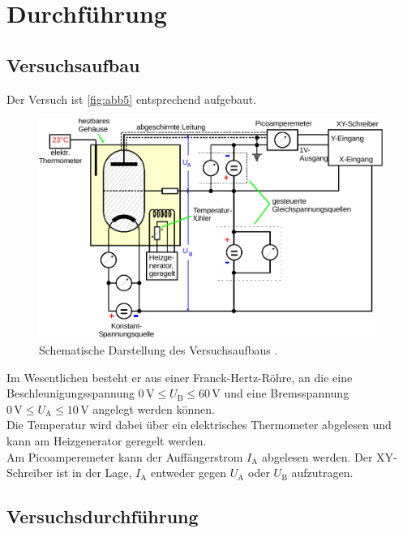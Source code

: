 \section{Durchführung}
\label{sec:Durchführung}

\subsection{Versuchsaufbau}

Der Versuch ist \autoref{fig:abb5} entsprechend aufgebaut.

\begin{figure}[H]
    \centering
    \includegraphics{figures/Abb_6.pdf}
    \caption{Schematische Darstellung des Versuchsaufbaus \cite{ap08}.}
    \label{fig:abb5}
\end{figure}

Im Wesentlichen besteht er aus einer Franck-Hertz-Röhre, an die eine Beschleunigungsspannung $0 \,\unit{\volt} \leq U_\text{B} \leq 60 \,\unit{\volt}$ 
und eine Bremsspannung $0 \,\unit{\volt} \leq U_\text{A} \leq 10 \,\unit{\volt}$ angelegt werden können. \\

Die Temperatur wird dabei über ein elektrisches Thermometer abgelesen und kann am Heizgenerator geregelt werden. \\

Am Picoamperemeter kann der Auffängerstrom $I_\text{A}$ abgelesen werden.
Der XY-Schreiber ist in der Lage, $I_\text{A}$ entweder gegen $U_\text{A}$ oder $U_\text{B}$ aufzutragen.


\subsection{Versuchsdurchführung}

